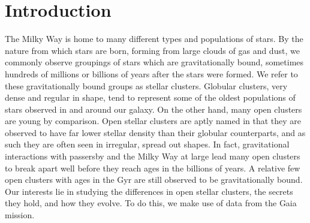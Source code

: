 \documentclass[onecolumn,table,xcdraw,super]{aastex631}
\begin{document}


\begin{abstract}

Stellar clusters provide a unique look into the populations of stars in our galaxy through different slices of time. The evolution of a population of stars is highly subject to initial conditions, and as such, through careful observation and rigorous analysis, one can infer those initial conditions from the comparison to models. In this work, we present our methods and findings on the process of filtering, fitting, and statistical analysis of 16 nearby open clusters. For each cluster, we have confidently identified cluster members before fitting thousands of permutations of synthetic isochrones and color excess to determine the best fit. We summarize the ages, metallicities, membership counts, and interstellar reddening of these open clusters. Additionally, we analyze the surface density and average mass drop-off of each cluster. Finally, we delve into the population statistics of open clusters in the Milky way, showing correlations such as mean cluster mass as a function of age, and more.



\end{abstract}
\clearpage
\tableofcontents
\clearpage


\section{Introduction} \label{sec:intro}

The Milky Way is home to many different types and populations of stars. By the nature from which stars are born, forming from large clouds of gas and dust, we commonly observe groupings of stars which are gravitationally bound, sometimes hundreds of millions or billions of years after the stars were formed. We refer to these gravitationally bound groups as stellar clusters. Globular clusters, very dense and regular in shape, tend to represent some of the oldest populations of stars observed in and around our galaxy. On the other hand, many open clusters are young by comparison. Open stellar clusters are aptly named in that they are observed to have far lower stellar density than their globular counterparts, and as such they are often seen in irregular, spread out shapes. In fact, gravitational interactions with passersby and the Milky Way at large lead many open clusters to break apart well before they reach ages in the billions of years. A relative few open clusters with ages in the Gyr are still observed to be gravitationally bound. Our interests lie in studying the differences in open stellar clusters, the secrets they hold, and how they evolve. To do this, we make use of data from the Gaia mission.
\end{document}
